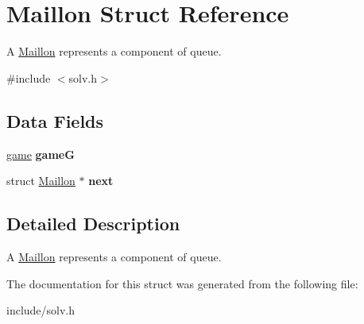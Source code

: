 \hypertarget{struct_maillon}{}\section{Maillon Struct Reference}
\label{struct_maillon}


A \hyperlink{struct_maillon}{Maillon} represents a component of queue.  




{\ttfamily \#include $<$solv.\+h$>$}

\subsection*{Data Fields}
\begin{DoxyCompactItemize}
\item 
\hyperlink{structgame__s}{game} {\bfseries gameG}\hypertarget{struct_maillon_ae4518868c413316c9eaaa54cc4f4a365}{}\label{struct_maillon_ae4518868c413316c9eaaa54cc4f4a365}

\item 
struct \hyperlink{struct_maillon}{Maillon} $\ast$ {\bfseries next}\hypertarget{struct_maillon_a4e47a0839badb5111e9e8203f0a35845}{}\label{struct_maillon_a4e47a0839badb5111e9e8203f0a35845}

\end{DoxyCompactItemize}


\subsection{Detailed Description}
A \hyperlink{struct_maillon}{Maillon} represents a component of queue. 

The documentation for this struct was generated from the following file\+:\begin{DoxyCompactItemize}
\item 
include/solv.\+h\end{DoxyCompactItemize}
